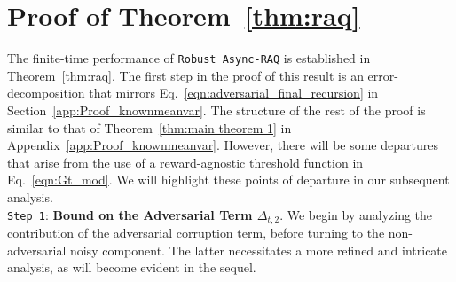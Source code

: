 \documentclass{article}
\begin{document}
\newpage
\vspace{-2mm}
\section{Proof of Theorem~\ref{thm:raq}}
\label{app:RAQproof}
The finite-time performance of \texttt{Robust Async-RAQ} is established in Theorem~\ref{thm:raq}. The first step in the proof of this result is an error-decomposition that mirrors Eq.~\eqref{eqn:adversarial_final_recursion} 
 in Section~\ref{app:Proof_knownmeanvar}. The structure of the rest of the proof is similar to that of Theorem~\ref{thm:main theorem 1} in Appendix~\ref{app:Proof_knownmeanvar}. However, there will be some departures that arise from the use of a reward-agnostic threshold function in Eq.~\eqref{eqn:Gt_mod}. We will highlight these points of departure in our subsequent analysis.\\
\textcolor{winered}{\texttt{Step 1}}: \textbf{Bound on the Adversarial Term \(\Delta_{t,2}\)}. We begin by analyzing the contribution of the adversarial corruption term, before turning to the non-adversarial noisy component. The latter necessitates a more refined and intricate analysis, as will become evident in the sequel. 
\end{document}
